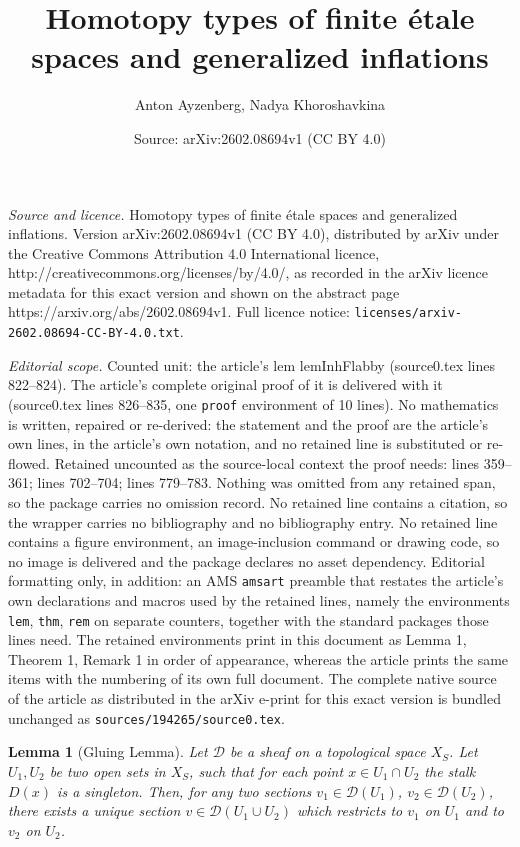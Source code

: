 \documentclass[10pt,a4paper]{amsart}
\title{Homotopy types of finite étale spaces and generalized inflations}
\author{Anton Ayzenberg, Nadya Khoroshavkina}
\date{Source: arXiv:2602.08694v1 (CC BY 4.0)}
\newtheorem{lem}{Lemma}
\newcommand{\ca}[1]{\mathcal{#1}}
\begin{document}
\maketitle

\noindent\emph{Source and licence.} Homotopy types of finite étale spaces and generalized inflations. Version arXiv:2602.08694v1 (CC BY 4.0), distributed by arXiv under the Creative Commons Attribution 4.0 International licence, http://creativecommons.org/licenses/by/4.0/, as recorded in the arXiv licence metadata for this exact version and shown on the abstract page https://arxiv.org/abs/2602.08694v1. Full licence notice: \texttt{licenses/arxiv-2602.08694-CC-BY-4.0.txt}.\par\smallskip

\noindent\textit{Editorial scope.} Counted unit: the article's lem lemInhFlabby (source0.tex lines 822--824). The article's complete original proof of it is delivered with it (source0.tex lines 826--835, one \texttt{proof} environment of 10 lines). No mathematics is written, repaired or re-derived: the statement and the proof are the article's own lines, in the article's own notation, and no retained line is substituted or re-flowed.  Retained uncounted as the source-local context the proof needs: lines 359--361; lines 702--704; lines 779--783.  Nothing was omitted from any retained span, so the package carries no omission record.  No retained line contains a citation, so the wrapper carries no bibliography and no bibliography entry.  No retained line contains a figure environment, an image-inclusion command or drawing code, so no image is delivered and the package declares no asset dependency.  Editorial formatting only, in addition: an AMS \texttt{amsart} preamble that restates the article's own declarations and macros used by the retained lines, namely the environments \texttt{lem}, \texttt{thm}, \texttt{rem} on separate counters, together with the standard packages those lines need.  The retained environments print in this document as Lemma 1, Theorem 1, Remark 1 in order of appearance, whereas the article prints the same items with the numbering of its own full document.  The complete native source of the article as distributed in the arXiv e-print for this exact version is bundled unchanged as \texttt{sources/194265/source0.tex}.
\begin{lem}[Gluing Lemma]\label{lemGlue}
Let $\ca{D}$ be a sheaf on a topological space $X_S$. Let $U_1,U_2$ be two open sets in $X_S$, such that for each point $x\in U_1\cap U_2$ the stalk $D(x)$ is a singleton. Then, for any two sections $v_1\in \ca{D}(U_1)$, $v_2\in \ca{D}(U_2)$, there exists a unique section $v\in \ca{D}(U_1\cup U_2)$ which restricts to $v_1$ on $U_1$ and to $v_2$ on $U_2$.
\end{lem}
\end{document}
